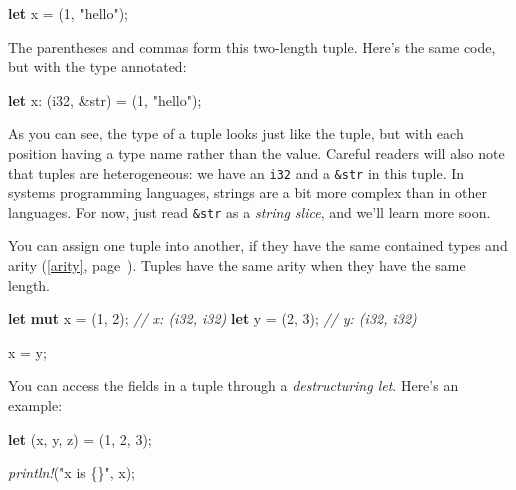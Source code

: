 \documentclass[a4paper,]{book}
\renewcommand*{\hyperref}[2][\ar]{%
  \def\ar{#2}%
  #2 (\autoref{#1}, page~\pageref{#1})}
\newenvironment{Shaded}{\begin{snugshade}}{\end{snugshade}}
\newcommand{\KeywordTok}[1]{\textcolor[rgb]{0.13,0.29,0.53}{\textbf{{#1}}}}
\newcommand{\DataTypeTok}[1]{\textcolor[rgb]{0.13,0.29,0.53}{{#1}}}
\newcommand{\DecValTok}[1]{\textcolor[rgb]{0.00,0.00,0.81}{{#1}}}
\newcommand{\StringTok}[1]{\textcolor[rgb]{0.31,0.60,0.02}{{#1}}}
\newcommand{\CommentTok}[1]{\textcolor[rgb]{0.56,0.35,0.01}{\textit{{#1}}}}
\newcommand{\PreprocessorTok}[1]{\textcolor[rgb]{0.56,0.35,0.01}{\textit{{#1}}}}
\newcommand{\NormalTok}[1]{{#1}}
\begin{document}
\begin{Shaded}
\begin{Highlighting}[]
\KeywordTok{let} \NormalTok{x = (}\DecValTok{1}\NormalTok{, }\StringTok{"hello"}\NormalTok{);}
\end{Highlighting}
\end{Shaded}

The parentheses and commas form this two-length tuple. Here's the same
code, but with the type annotated:

\begin{Shaded}
\begin{Highlighting}[]
\KeywordTok{let} \NormalTok{x: (}\DataTypeTok{i32}\NormalTok{, &}\DataTypeTok{str}\NormalTok{) = (}\DecValTok{1}\NormalTok{, }\StringTok{"hello"}\NormalTok{);}
\end{Highlighting}
\end{Shaded}

As you can see, the type of a tuple looks just like the tuple, but with
each position having a type name rather than the value. Careful readers
will also note that tuples are heterogeneous: we have an \texttt{i32}
and a \texttt{\&str} in this tuple. In systems programming languages,
strings are a bit more complex than in other languages. For now, just
read \texttt{\&str} as a \emph{string slice}, and we'll learn more soon.

You can assign one tuple into another, if they have the same contained
types and \hyperref[arity]{arity}. Tuples have the same arity when they
have the same length.

\begin{Shaded}
\begin{Highlighting}[]
\KeywordTok{let} \KeywordTok{mut} \NormalTok{x = (}\DecValTok{1}\NormalTok{, }\DecValTok{2}\NormalTok{); }\CommentTok{// x: (i32, i32)}
\KeywordTok{let} \NormalTok{y = (}\DecValTok{2}\NormalTok{, }\DecValTok{3}\NormalTok{); }\CommentTok{// y: (i32, i32)}

\NormalTok{x = y;}
\end{Highlighting}
\end{Shaded}

You can access the fields in a tuple through a \emph{destructuring let}.
Here's an example:

\begin{Shaded}
\begin{Highlighting}[]
\KeywordTok{let} \NormalTok{(x, y, z) = (}\DecValTok{1}\NormalTok{, }\DecValTok{2}\NormalTok{, }\DecValTok{3}\NormalTok{);}

\PreprocessorTok{println!}\NormalTok{(}\StringTok{"x is \{\}"}\NormalTok{, x);}
\end{Highlighting}
\end{Shaded}
\end{document}
